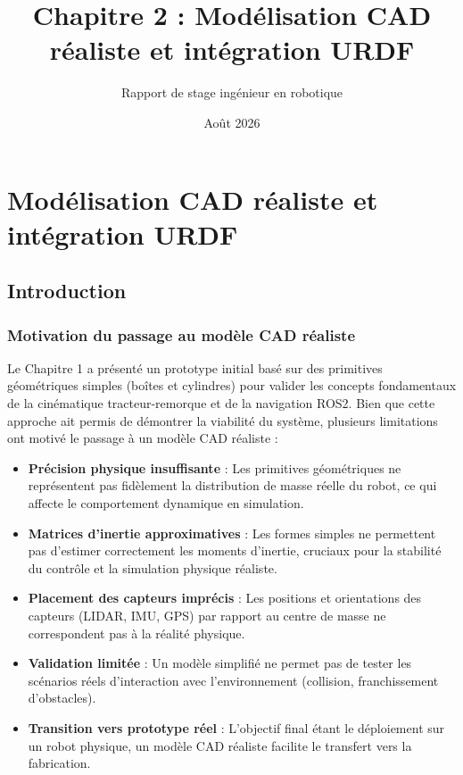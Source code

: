 \documentclass[a4paper,12pt]{report}
\title{Chapitre 2 : Modélisation CAD réaliste et intégration URDF}
\author{Rapport de stage ingénieur en robotique}
\date{Août 2026}
\begin{document}
\maketitle

\tableofcontents

\chapter{Modélisation CAD réaliste et intégration URDF}

\section{Introduction}

\subsection{Motivation du passage au modèle CAD réaliste}

Le Chapitre 1 a présenté un prototype initial basé sur des primitives géométriques simples (boîtes et cylindres) pour valider les concepts fondamentaux de la cinématique tracteur-remorque et de la navigation ROS2. Bien que cette approche ait permis de démontrer la viabilité du système, plusieurs limitations ont motivé le passage à un modèle CAD réaliste :

\begin{itemize}
    \item \textbf{Précision physique insuffisante} : Les primitives géométriques ne représentent pas fidèlement la distribution de masse réelle du robot, ce qui affecte le comportement dynamique en simulation.
    \item \textbf{Matrices d'inertie approximatives} : Les formes simples ne permettent pas d'estimer correctement les moments d'inertie, cruciaux pour la stabilité du contrôle et la simulation physique réaliste.
    \item \textbf{Placement des capteurs imprécis} : Les positions et orientations des capteurs (LIDAR, IMU, GPS) par rapport au centre de masse ne correspondent pas à la réalité physique.
    \item \textbf{Validation limitée} : Un modèle simplifié ne permet pas de tester les scénarios réels d'interaction avec l'environnement (collision, franchissement d'obstacles).
    \item \textbf{Transition vers prototype réel} : L'objectif final étant le déploiement sur un robot physique, un modèle CAD réaliste facilite le transfert vers la fabrication.
\end{itemize}
\end{document}
